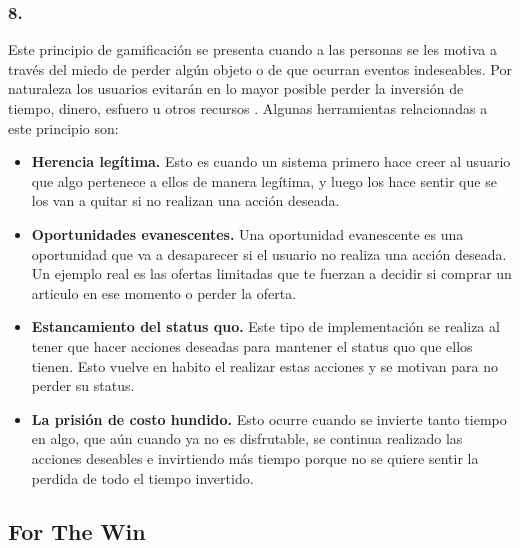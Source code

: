 \subsubsection{8. \principioVIII} \label{subsec:principioVIII}

 Este principio de gamificación se presenta cuando a las personas se les motiva a través del miedo
 de perder algún objeto o de que ocurran eventos indeseables. Por naturaleza los usuarios evitarán
 en lo mayor posible perder la inversión de tiempo, dinero, esfuero u otros recursos \cite{Octalysis}.
 Algunas herramientas relacionadas a este principio son:
        
    \begin{itemize}
    \item
    {\bf Herencia legítima.}
        Esto es cuando un sistema primero hace creer al usuario que algo pertenece a ellos de manera
        legítima, y luego los hace sentir que se los van a quitar si no realizan una acción deseada.
        \cite[p. 330]{Octalysis}
            
    \item
    {\bf Oportunidades evanescentes.}
        Una oportunidad evanescente es una oportunidad que va a desaparecer si el usuario no
        realiza una acción deseada. Un ejemplo real es las ofertas limitadas que te fuerzan
        a decidir si comprar un articulo en ese momento o perder la oferta.
        \cite[p. 333]{Octalysis}
            
    \item
    {\bf Estancamiento del status quo.}
        Este tipo de implementación se realiza al tener que hacer acciones deseadas para
        mantener el status quo que ellos tienen. Esto vuelve en habito el realizar estas
        acciones y se motivan para no perder su status.
        \cite[p. 334]{Octalysis}
            
    \item
    {\bf La prisión de costo hundido.}
        Esto ocurre cuando se invierte tanto tiempo en algo, que aún cuando ya no es disfrutable,
        se continua realizado las acciones deseables e invirtiendo más tiempo porque no se quiere
        sentir la perdida de todo el tiempo invertido.
        \cite[p. 338]{Octalysis}

    \end{itemize}
    
\clearpage


\subsection{For The Win} \label{sec:ForTheWin}

